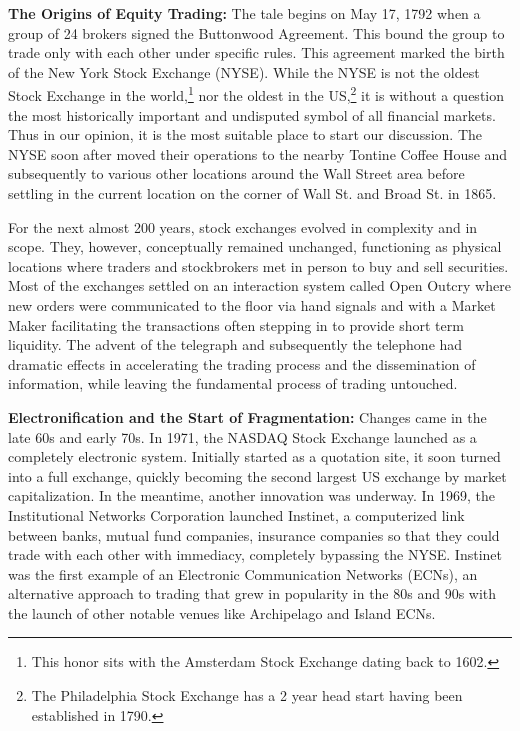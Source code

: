 \noindent\textbf{The Origins of Equity Trading:} The tale begins on May 17, 1792 when a group of 24 brokers signed the Buttonwood Agreement. This bound the group to trade only with each other under specific rules. This agreement marked the birth of the New York Stock Exchange (NYSE). While the NYSE is not the oldest Stock Exchange in the world,\footnote{This honor sits with the Amsterdam Stock Exchange dating back to 1602.} nor the oldest in the US,\footnote{The Philadelphia Stock Exchange has a 2 year head start having been established in 1790.} it is without a question the most historically important and undisputed symbol of all financial markets. Thus in our opinion, it is the most suitable place to start our discussion. The NYSE soon after moved their operations to the nearby Tontine Coffee House and subsequently to various other locations around the Wall Street area before settling in the current location on the corner of Wall St. and Broad St. in 1865.


For the next almost 200 years, stock exchanges evolved in complexity and in scope. They, however, conceptually remained unchanged, functioning as physical locations where traders and stockbrokers met in person to buy and sell securities. Most of the exchanges settled on an interaction system called Open Outcry where new orders were communicated to the floor via hand signals and with a Market Maker facilitating the transactions often stepping in to provide short term liquidity. The advent of the telegraph and subsequently the telephone had dramatic effects in accelerating the trading process and the dissemination of information, while leaving the fundamental process of trading untouched. \twomedskip


\noindent\textbf{Electronification and the Start of Fragmentation:} Changes came in the late 60s and early 70s. In 1971, the NASDAQ Stock Exchange launched as a completely electronic system. Initially started as a quotation site, it soon turned into a full exchange, quickly becoming the second largest US exchange by market capitalization. In the meantime, another innovation was underway. In 1969, the Institutional Networks Corporation launched Instinet, a computerized link between banks, mutual fund companies, insurance companies so that they could trade with each other with immediacy, completely bypassing the NYSE. Instinet was the first example of an Electronic Communication Networks (ECNs), an alternative approach to trading that grew in popularity in the 80s and 90s with the launch of other notable venues like Archipelago and Island ECNs.


